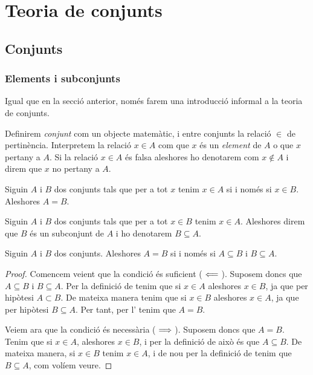 \documentclass[../../Main.tex]{subfiles}
\begin{document}
\chapter{Teoria de conjunts}
\section{Conjunts}
	\subsection{Elements i subconjunts}
	Igual que en la secció anterior, només farem una introducció informal a la teoria de conjunts.
	
	Definirem \emph{conjunt} com un objecte matemàtic, i entre conjunts la relació \(\in\) de pertinència. Interpretem la relació \(x\in A\) com que \(x\) és un \emph{element} de \(A\) o que \(x\) pertany a \(A\). Si la relació \(x\in A\) és falsa aleshores ho denotarem com \(x\notin A\) i direm que \(x\) no pertany a \(A\).
	\begin{axiom}
		\label{axiom:axioma d'extensionalitat}
		Siguin \(A\) i \(B\) dos conjunts tals que per a tot \(x\) tenim \(x\in A\) si i només si \(x\in B\). Aleshores \(A=B\).
	\end{axiom}
	\begin{definition}[Subconjunt]
		\label{def:subconjunt}
		Siguin \(A\) i \(B\) dos conjunts tals que per a tot \(x\in B\) tenim \(x\in A\). Aleshores direm que \(B\) és un subconjunt de \(A\) i ho denotarem \(B\subseteq A\).
	\end{definition}
	\begin{theorem}
		\label{thm:doble inclusió}
		Siguin \(A\) i \(B\) dos conjunts. Aleshores \(A=B\) si i només si \(A\subseteq B\) i \(B\subseteq A\).
		\begin{proof}
			Comencem veient que la condició és suficient (\(\impliedby\)). Suposem doncs que \(A\subseteq B\) i \(B\subseteq A\). Per la definició de  tenim que si \(x\in A\) aleshores \(x\in B\), ja que per hipòtesi \(A\subset B\). De mateixa manera tenim que si \(x\in B\) aleshores \(x\in A\), ja que per hipòtesi \(B\subseteq A\). Per tant, per l' tenim que \(A=B\).
			
			Veiem ara que la condició és necessària (\(\implies\)). Suposem doncs que \(A=B\). Tenim que si \(x\in A\), aleshores \(x\in B\), i per la definició de  això és que \(A\subseteq B\). De mateixa manera, si \(x\in B\) tenim \(x\in A\), i de nou per la definició de  tenim que \(B\subseteq A\), com volíem veure.
		\end{proof}
	\end{theorem}
\end{document}
